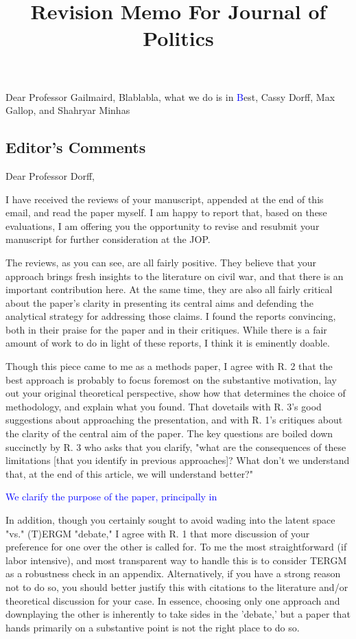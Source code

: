 \documentclass[12pt,onesided,fullpage]{amsart}
\begin{document}
\title{Revision Memo For Journal of Politics}
Dear Professor Gailmaird,
Blablabla, what we do is in \textcolor{blue}
Best,
Cassy Dorff, Max Gallop, and Shahryar Minhas

\subsection{Editor's Comments}
Dear Professor Dorff,

I have received the reviews of your manuscript, appended at the end of this email, and read the paper myself. I am happy to report that, based on these evaluations, I am offering you the opportunity to revise and resubmit your manuscript for further consideration at the JOP. 

The reviews, as you can see, are all fairly positive. They believe that your approach brings fresh insights to the literature on civil war, and that there is an important contribution here. At the same time, they are also all fairly critical about the paper's clarity in presenting its central aims and defending the analytical strategy for addressing those claims. I found the reports convincing, both in their praise for the paper and in their critiques. While there is a fair amount of work to do in light of these reports, I think it is eminently doable. 

Though this piece came to me as a methods paper, I agree with R. 2 that the best approach is probably to focus foremost on the substantive motivation, lay out your original theoretical perspective, show how that determines the choice of methodology, and explain what you found. That dovetails with R. 3's good suggestions about approaching the presentation, and with R. 1's critiques about the clarity of the central aim of the paper. The key questions are boiled down succinctly by R. 3 who asks that you clarify, "what are the consequences of these limitations [that you identify in previous approaches]? What don't we understand that, at the end of this article, we will understand better?"

\textcolor{blue}{We clarify the purpose of the paper, principally in }


In addition, though you certainly sought to avoid wading into the latent space "vs." (T)ERGM "debate," I agree with R. 1 that more discussion of your preference for one over the other is called for. To me the most straightforward (if labor intensive), and most transparent way to handle this is to consider TERGM as a robustness check in an appendix. Alternatively, if you have a strong reason not to do so, you should better justify this with citations to the literature and/or theoretical discussion for your case. In essence, choosing only one approach and downplaying the other is inherently to take sides in the 'debate,' but a paper that hands primarily on a substantive point is not the right place to do so. 
\end{document}
